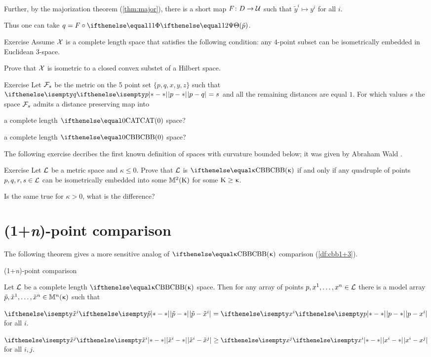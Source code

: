 Further, by the majorization theorem (\ref{thm:major}), 
there is a short map $F\:D\to \spc{U}$ such that $\tilde y^i\mapsto y^i$ for all $i$.

Thus one can take $q=F\circ\map(\tilde p)$.
\qeds

\begin{thm}{Exercise}\label{ex:CBB+CBA}
Assume $\mathcal{X}$ is a complete length space that satisfies the following condition:
any 4-point subset can be isometrically embedded in Euclidean 3-space.

Prove that $\mathcal{X}$ is isometric to a closed convex substet of a Hilbert space.
\end{thm}

\begin{thm}{Exercise}\label{ex:5-point-CBA=>CBB}
Let $\mathcal{F}_s$ be the metric
on the 5 point set $\{p,q,x,y,z\}$ such that $\dist{p}{q}{}=s$
and all the remaining distances are equal $1$.
For which values $s$ the space $\mathcal{F}_s$ admits a distance preserving map into 
\begin{subthm}{}
a complete length $\CAT{0}$ space?
\end{subthm}
\begin{subthm}{}
a complete length $\Alex{0}$ space?
\end{subthm}
\end{thm}

The following exercise decribes the first known definition of spaces with curvature bounded below;
it was given by Abraham Wald \cite{wald}. 

\begin{thm}{Exercise}\label{ex:cbb-wald}
Let $\mathcal{L}$ be a metric space and $\kappa\le 0$.
Prove that $\mathcal{L}$ is $\Alex\kappa$ if and only if  any quadruple of points $p,q,r,s\in \spc{L}$ can be isometrically embedded into some $\mathbb{M}_{{}}^{2}({\mathrm{K}})$ for some $\Kappa\ge\kappa$.

Is the same true for $\kappa>0$, what is the difference?
\end{thm}

\section{(1+\textit{n})-point comparison}\label{sec:1+n}

The following theorem gives a more sensitive analog of  $\Alex\kappa$ comparison (\ref{df:cbb1+3}).

\begin{thm}{(1+\textit{n})-point comparison}
\label{thm:pos-config} {\sloppy 
Let $\mathcal{L}$ be a complete length $\Alex{\kappa}$ space.
Then for any array of points $p,x^1,\dots,x^n\in \spc{L}$  
there is a model array $\tilde p,\tilde x^1,\dots,\tilde x^n\in\Lob{n}\kappa$ such that

}

\begin{subthm}{}
$\dist{\tilde p}{\tilde x^i}{}=\dist{p}{x^i}{}$ for all $i$.
\end{subthm}

\begin{subthm}{}$\dist{\tilde x^i}{\tilde x^j}{}\ge\dist{x^i}{x^j}{}$ for all $i,j$.
\end{subthm}
\end{thm}

